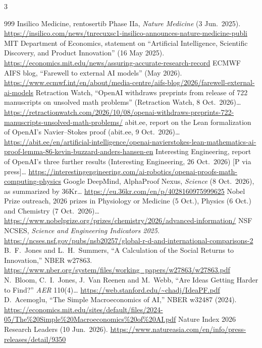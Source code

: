 \begin{multicols}{3}
\begin{thebibliography}{999}
 Insilico Medicine, rentosertib Phase IIa, \emph{Nature Medicine} (3 Jun.\ 2025). \url{https://insilico.com/news/tnrecuxsc1-insilico-announces-nature-medicine-publi}
 MIT Department of Economics, statement on ``Artificial Intelligence, Scientific Discovery, and Product Innovation'' (16 May 2025). \url{https://economics.mit.edu/news/assuring-accurate-research-record}
 ECMWF AIFS blog, ``Farewell to external AI models'' (May 2026). \url{https://www.ecmwf.int/en/about/media-centre/aifs-blog/2026/farewell-external-ai-models}
 Retraction Watch, ``OpenAI withdraws preprints from release of 722 manuscripts on unsolved math problems'' (Retraction Watch, 8 Oct.\ 2026)… \url{https://retractionwatch.com/2026/10/08/openai-withdraws-preprints-722-manuscripts-unsolved-math-problems/}
 abit.ee, report on the Lean formalization of OpenAI's Navier--Stokes proof (abit.ee, 9 Oct.\ 2026)… \url{https://abit.ee/en/artificial-intelligence/openai-navierstokes-lean-mathematics-ai-proof-lemma-86-kevin-buzzard-anders-hansen-en}
 Interesting Engineering, report of OpenAI's three further results (Interesting Engineering, 26 Oct.\ 2026) [P via press]… \url{https://interestingengineering.com/ai-robotics/openai-proofs-math-computing-physics}
 Google DeepMind, AlphaProof Nexus, \emph{Science} (8 Oct.\ 2026), as summarized by 36Kr… \url{https://eu.36kr.com/en/p/4028160975999625}
 Nobel Prize outreach, 2026 prizes in Physiology or Medicine (5 Oct.), Physics (6 Oct.) and Chemistry (7 Oct.\ 2026)… \url{https://www.nobelprize.org/prizes/chemistry/2026/advanced-information/}
 NSF NCSES, \emph{Science and Engineering Indicators 2025}. \url{https://ncses.nsf.gov/pubs/nsb20257/global-r-d-and-international-comparisons-2}
 B.~F.~Jones and L.~H.~Summers, ``A Calculation of the Social Returns to Innovation,'' NBER w27863. \url{https://www.nber.org/system/files/working_papers/w27863/w27863.pdf}
 N.~Bloom, C.~I.~Jones, J.~Van Reenen and M.~Webb, ``Are Ideas Getting Harder to Find?'' \emph{AER} 110(4)… \url{https://web.stanford.edu/~chadj/IdeaPF.pdf}
 D.~Acemoglu, ``The Simple Macroeconomics of AI,'' NBER w32487 (2024). \url{https://economics.mit.edu/sites/default/files/2024-05/The\%20Simple\%20Macroeconomics\%20of\%20AI.pdf}
 Nature Index 2026 Research Leaders (10 Jun.\ 2026). \url{https://www.natureasia.com/en/info/press-releases/detail/9350}

\end{thebibliography}
\end{multicols}
